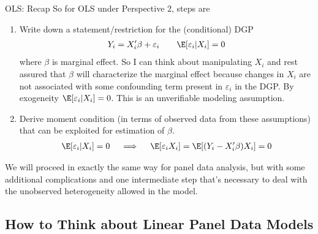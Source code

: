 \documentclass[aspectratio=169, handout]{beamer}
\begin{document}
{\footnotesize
\begin{frame}{OLS: Recap}
So for OLS under Perspective 2, steps are
\begin{enumerate}
  \item Write down a \alert{statement}/\alert{restriction} for the
    (conditional) DGP
    \begin{align*}
      Y_i
      =
      X_i'\beta
      +
      \varepsilon_i
      \qquad
      \E[\varepsilon_i|X_i]=0
    \end{align*}
    where $\beta$ is marginal effect.
    So I can think about manipulating $X_i$ and rest assured that
    $\beta$ will characterize the marginal effect because changes in
    $X_i$ are not associated with some confounding term present in
    $\varepsilon_i$ in the DGP.
    By exogeneity $\E[\varepsilon_i|X_i]=0$.
    This is an unverifiable modeling assumption.

  \item
    Derive \alert{moment condition} (in terms of observed data from these
    assumptions)
    that can be exploited for estimation of $\beta$.
    \begin{align*}
      \E[\varepsilon_i|X_i]=0
      \quad\implies\quad
      \E[\varepsilon_iX_i]
      =\E[(Y_i-X_i'\beta)X_i]
      =0
    \end{align*}
\end{enumerate}
We will proceed in exactly the same way for panel data analysis, but
with some additional complications and one intermediate step that's
necessary to deal with the \alert{unobserved heterogeneity} allowed in
the model.
\end{frame}
}



\subsection{How to Think about Linear Panel Data Models}
\end{document}
